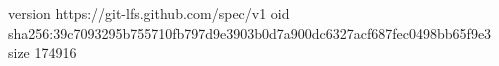 version https://git-lfs.github.com/spec/v1
oid sha256:39c7093295b755710fb797d9e3903b0d7a900dc6327acf687fec0498bb65f9e3
size 174916
